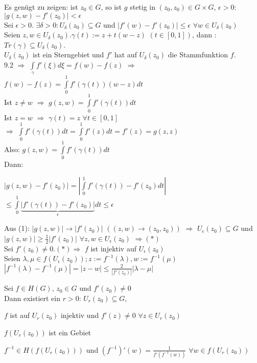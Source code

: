 \documentclass[a4paper,twoside,DIV15,BCOR12mm]{scrbook}
\begin{document}
\begin{beweis}
\begin{liste}
\item Es genügt zu zeigen: ist $z_0 \in G$, so ist $g$ stetig in $(z_0, z_0) \in G
\times G$, $\epsilon > 0$: $|g(z,w)-f'(z_0)| < \epsilon$ \\
Sei $\epsilon > 0$. $\exists \delta > 0: U_\delta(z_0) \subseteq G$ und
$|f'(w)-f'(z_0)| \leq \epsilon$ $\forall w \in U_\delta(z_0)$ \\
Seien $z,w \in U_\delta(z_0). \gamma(t):= z + t(w - z)$ $(t\in [0,1])$, dann : 
\\ $Tr(\gamma) \subseteq U_\delta(z_0)$. \\$U_\delta(z_0)$ ist ein Sterngebiet und
$f'$ hat auf $U_\delta(z_0)$ die Stammfunktion $f$. \\
9.2 $\Rightarrow $ $\int\limits_{\gamma} f'(\xi)d \xi = f(w) - f(z)$
$\Rightarrow$ $ f(w) - f(z) = \int\limits_{0}^1 f'(\gamma(t))(w-z)dt $ \\
Ist $z \neq w$ $\Rightarrow$ $g(z,w) =  \int\limits_{0}^1 f'(\gamma(t))dt $ \\
Ist $z = w$  $\Rightarrow$ $\gamma(t) = z$ $\forall t \in [0,1]$\\ $\Rightarrow$  
$\int\limits_{0}^1 f'(\gamma(t)) dt =  \int\limits_{0}^1 f'(z)dt = f'(z) =
g(z,z)$ \\ Also: $g(z,w) =  \int\limits_{0}^1 f'(\gamma(t))dt $ \\
Dann: \\
\centerline{$|g(z,w)-f'(z_0)| = | \int\limits_{0}^1 f'(\gamma(t))-f'(z_0)dt |$ $\leq 
\int\limits_{0}^1 \underbrace{|f'(\gamma(t))-f'(z_0)|}_{\epsilon}dt \leq \epsilon$}
\item Aus (1): $|g(z,w)| \to |f'(z_0)| $ $ ((z,w) \to (z_0, z_0))$ $\Rightarrow$
$U_\epsilon(z_0) \subseteq G$ und $|g(z,w)| \geq \frac{1}{2}|f'(z_0)|$ $\forall
z, w \in U_\epsilon(z_0)$ $\Rightarrow (*)$\\
Sei $f'(z_0) \neq 0. (*) \Rightarrow$ $f$ ist injektiv auf $U_\epsilon(z_0)$ \\
Seien $\lambda, \mu \in f(U_\epsilon(z_0)); z := f^{-1}(\lambda), w :=
f^{-1}(\mu)$ \\
$|f^{-1}(\lambda) - f^{-1}(\mu) | = |z -w | \leq \frac{2}{|f'(z_0)|}|\lambda - \mu|$
\end{liste}
\end{beweis}

\begin{satz}
Sei $f \in H(G)$, $z_0 \in G$ und $f'(z_0) \neq 0$ \\
Dann existiert ein $r > 0$: $U_r(z_0) \subseteq G$,
\begin{liste}
\item $f$ ist auf $U_r(z_0)$ injektiv und  $f'(z) \neq 0$ $\forall z \in U_r(z_0)$
\item $f(U_r(z_0))$ ist ein Gebiet
\item $f^{-1} \in H(f(U_r(z_0)))$ und $(f^{-1})'(w) = \frac{1}{f'(f^{-1}(w))}$
$\forall w \in f(U_r(z_0))$
\end{liste}
\end{satz}
\end{document}
